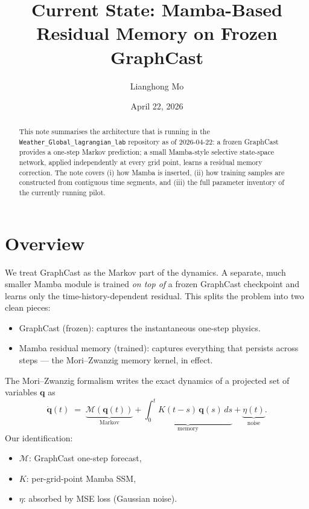 \documentclass[11pt,a4paper]{article}
\title{Current State: Mamba-Based Residual Memory on Frozen GraphCast}
\author{Lianghong Mo}
\date{April 22, 2026}
\begin{document}
\maketitle

\begin{abstract}
This note summarises the architecture that is running in the \texttt{Weather\_Global\_lagrangian\_lab} repository as of 2026-04-22: a frozen GraphCast provides a one-step Markov prediction; a small Mamba-style selective state-space network, applied independently at every grid point, learns a residual memory correction. The note covers (i) how Mamba is inserted, (ii) how training samples are constructed from contiguous time segments, and (iii) the full parameter inventory of the currently running pilot.
\end{abstract}

\tableofcontents

\section{Overview}

We treat GraphCast as the Markov part of the dynamics. A separate, much smaller Mamba module is trained \emph{on top of} a frozen GraphCast checkpoint and learns only the time-history-dependent residual. This splits the problem into two clean pieces:
\begin{itemize}[nosep]
  \item GraphCast (frozen): captures the instantaneous one-step physics.
  \item Mamba residual memory (trained): captures everything that persists across steps --- the Mori--Zwanzig memory kernel, in effect.
\end{itemize}

The Mori--Zwanzig formalism writes the exact dynamics of a projected set of variables $\mathbf{q}$ as
\[
\dot{\mathbf{q}}(t) \;=\; \underbrace{\mathcal{M}(\mathbf{q}(t))}_{\text{Markov}} + \underbrace{\int_0^t K(t{-}s)\,\mathbf{q}(s)\,ds}_{\text{memory}} + \underbrace{\eta(t)}_{\text{noise}}.
\]
Our identification:
\begin{itemize}[nosep]
  \item $\mathcal{M}$: GraphCast one-step forecast,
  \item $K$: per-grid-point Mamba SSM,
  \item $\eta$: absorbed by MSE loss (Gaussian noise).
\end{itemize}
\end{document}
